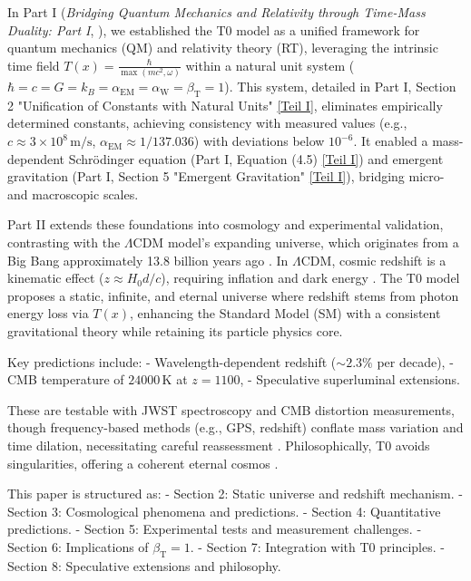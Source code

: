 \documentclass[twocolumn,aps,prl]{revtex4-2}
\newcommand{\Tfield}{T(x)}
\newcommand{\alphaEM}{\alpha_{\text{EM}}}
\newcommand{\alphaW}{\alpha_{\text{W}}}
\newcommand{\betaT}{\beta_{\text{T}}}
\newcommand{\LCDM}{\Lambda\text{CDM}}
\begin{document}
	In Part I (\textit{Bridging Quantum Mechanics and Relativity through Time-Mass Duality: Part I}, \cite{pascher_part1_2025}), we established the T0 model as a unified framework for quantum mechanics (QM) and relativity theory (RT), leveraging the intrinsic time field \(\Tfield = \frac{\hbar}{\max(mc^2, \omega)}\) within a natural unit system (\(\hbar = c = G = k_B = \alphaEM = \alphaW = \betaT = 1\)). This system, detailed in Part I, Section 2 "Unification of Constants with Natural Units" \href{https://github.com/jpascher/T0-Time-Mass-Duality/tree/main/2/pdf/English/QMRelTimeMassPart1En.pdf}{[Teil I]}, eliminates empirically determined constants, achieving consistency with measured values (e.g., \(c \approx 3 \times 10^8 \, \text{m/s}\), \(\alphaEM \approx 1/137.036\)) with deviations below \(10^{-6}\). It enabled a mass-dependent Schrödinger equation (Part I, Equation (4.5) \href{https://github.com/jpascher/T0-Time-Mass-Duality/tree/main/2/pdf/English/QMRelTimeMassPart1En.pdf}{[Teil I]}) and emergent gravitation (Part I, Section 5 "Emergent Gravitation" \href{https://github.com/jpascher/T0-Time-Mass-Duality/tree/main/2/pdf/English/QMRelTimeMassPart1En.pdf}{[Teil I]}), bridging micro- and macroscopic scales.
	
	Part II extends these foundations into cosmology and experimental validation, contrasting with the \(\LCDM\) model’s expanding universe, which originates from a Big Bang approximately 13.8 billion years ago \cite{Planck2020}. In \(\LCDM\), cosmic redshift is a kinematic effect (\(z \approx H_0 d / c\)), requiring inflation and dark energy \cite{Riess1998,Perlmutter1999}. The T0 model proposes a static, infinite, and eternal universe where redshift stems from photon energy loss via \(\Tfield\), enhancing the Standard Model (SM) with a consistent gravitational theory while retaining its particle physics core.
	
	Key predictions include:
	- Wavelength-dependent redshift (\(\sim 2.3\%\) per decade),
	- CMB temperature of \(24000 \, \text{K}\) at \(z = 1100\),
	- Speculative superluminal extensions.
	
	These are testable with JWST spectroscopy and CMB distortion measurements, though frequency-based methods (e.g., GPS, redshift) conflate mass variation and time dilation, necessitating careful reassessment \cite{pascher_quantum_2025}. Philosophically, T0 avoids singularities, offering a coherent eternal cosmos \cite{pascher_perspective_2025}.
	
	This paper is structured as:
	- Section 2: Static universe and redshift mechanism.
	- Section 3: Cosmological phenomena and predictions.
	- Section 4: Quantitative predictions.
	- Section 5: Experimental tests and measurement challenges.
	- Section 6: Implications of \(\betaT = 1\).
	- Section 7: Integration with T0 principles.
	- Section 8: Speculative extensions and philosophy.
	
\end{document}
